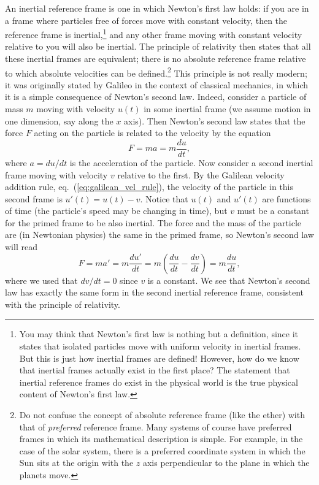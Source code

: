 \documentclass[11pt, a4paper,oneside,openright]{book}
\numberwithin{equation}{section}
\begin{document}
An inertial reference frame is one in which Newton's first law holds: if you are in a frame where particles free of forces move with constant velocity, then the reference frame is inertial,\footnote{You may think that Newton's first law is nothing but a definition, since it states that isolated particles move with uniform velocity in inertial frames. But this is just how inertial frames are defined! However, how do we know that inertial frames actually exist in the first place? The statement that inertial reference frames do exist in the physical world is the true physical content of Newton's first law.} and any other frame moving with constant velocity relative to you will also be inertial. The principle of relativity then states that all these inertial frames are equivalent; there is no absolute reference frame relative to which absolute velocities can be defined.\footnote{Do not confuse the concept of absolute reference frame (like the ether) with that of {\it preferred} reference frame. Many systems of 
course have preferred frames in which its mathematical description is simple. For example, in the case of the solar system, there is a preferred coordinate system in which the Sun sits at the origin with the $z$ axis perpendicular to the plane in which the planets move.} This principle is not really modern; it was originally stated by Galileo in the context of classical mechanics, in which it is a simple consequence of Newton's second law. Indeed, consider a particle of mass $m$ moving with velocity $u(t)$ in some inertial frame (we assume motion in one dimension, say along the $x$ axis). Then Newton's second law states that the force $F$ acting on the particle is related to the velocity by the equation
\begin{equation}
F=ma=m\frac{du}{dt},
\end{equation}
where $a=du/dt$ is the acceleration of the particle. Now consider a second inertial frame moving with velocity $v$ relative to the first. By the Galilean velocity addition rule, eq.\ (\ref{eq:galilean_vel_rule}), the velocity of the particle in this second frame is $u'(t)=u(t)-v$. Notice that $u(t)$ and $u'(t)$ are functions of time (the particle's speed may be changing in time), but $v$ must be a constant for the primed frame to be also inertial. The force and the mass of the particle are (in Newtonian physics) the same in the primed frame, so Newton's second law will read
\begin{equation}
F=ma'=m\frac{du'}{dt}=m\left(\frac{du}{dt}-\frac{dv}{dt}\right)=m\frac{du}{dt},
\end{equation}
where we used that $dv/dt=0$ since $v$ is a constant. We see that Newton's second law has exactly the same form in the second inertial reference frame, consistent with the principle of relativity.
\end{document}
